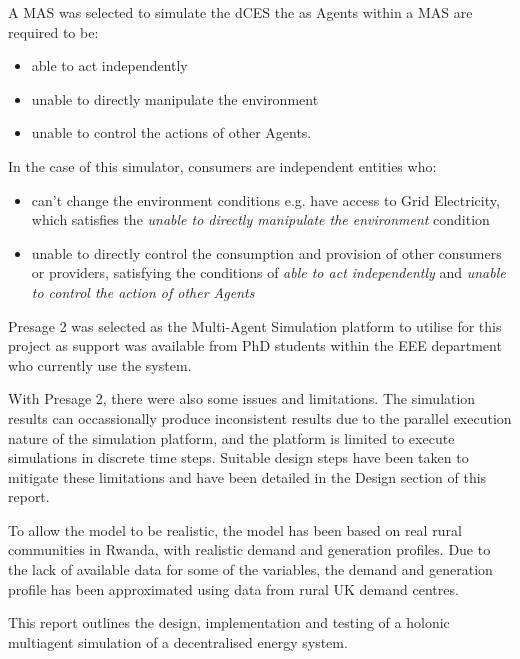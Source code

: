 A MAS was selected to simulate the dCES the as Agents within a MAS are required to be:
\begin{itemize}
	\item able to act independently
	\item unable to directly manipulate the environment
	\item unable to control the actions of other Agents. 
\end{itemize}
In the case of this simulator, consumers are independent entities who:
\begin{itemize}
 	\item can't change the environment conditions e.g. have access to Grid Electricity, which satisfies the \textit{unable to directly manipulate the environment} condition
 	\item unable to directly control the consumption and provision of other consumers or providers, satisfying the conditions of \textit{able to act independently} and \textit{unable to control the action of other Agents} 
\end{itemize}
Presage 2 was selected as the Multi-Agent Simulation platform to utilise for this project as support was available from PhD students within the EEE department who currently use the system.

With Presage 2, there were also some issues and limitations. The simulation results can occassionally produce inconsistent results due to the parallel execution nature of the simulation platform, and the platform is limited to execute simulations in discrete time steps. Suitable design steps have been taken to mitigate these limitations and have been detailed in the Design section of this report. 

To allow the model to be realistic, the model has been based on real rural communities in Rwanda, with realistic demand and generation profiles. Due to the lack of available data for some of the variables, the demand and generation profile has been approximated using data from rural UK demand centres.

This report outlines the design, implementation and testing of a holonic multiagent simulation of a decentralised energy system. 

